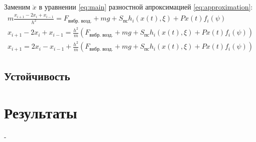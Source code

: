 ~\

\noindent Заменим $\ddot{x}$ в уравнении \ref{eq:main} разностной апроксимацией \ref{eq:approximation}:
\begin{equation}
    \begin{aligned}
        m\frac{x_{i+1} - 2x_i + x_{i-1}}{h^2} = F_\text{вибр. возд.} + mg + S_\text{пс} h_i(x(t), \xi)+ P x(t) f_i(\psi)\\
        x_{i+1} - 2x_i + x_{i-1} = \frac{h^2}{m}(F_\text{вибр. возд.} + mg + S_\text{пс} h_i(x(t), \xi) + P x(t) f_i(\psi))\\
        x_{i+1} = 2x_i - x_{i-1} + \frac{h^2}{m}(F_\text{вибр. возд.} + mg + S_\text{пс} h_i(x(t), \xi) + P x(t) f_i(\psi))
    \end{aligned}
\end{equation}

\subsection{Устойчивость}

\clearpage

\section{Результаты}

\clearpage


\begin{thebibliography}{}
     -
\end{thebibliography}